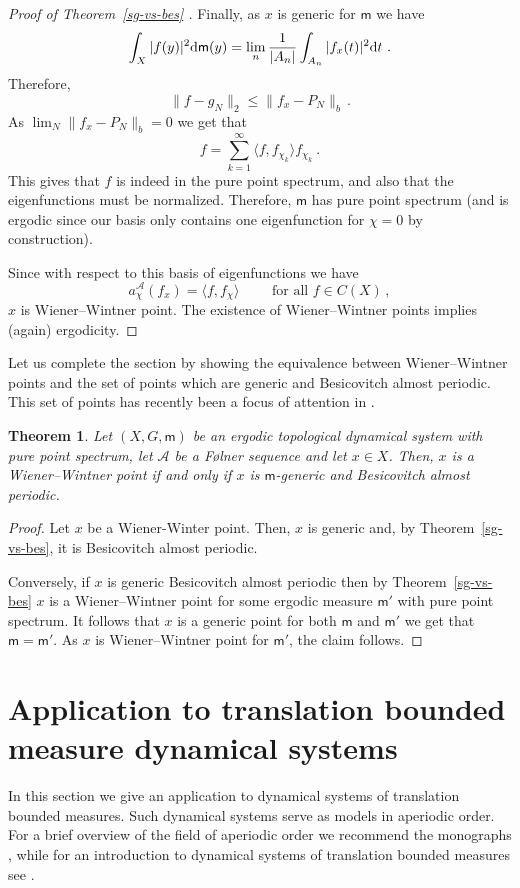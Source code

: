 \documentclass [14pt]{amsart}
\numberwithin{equation}{section}
\newcommand{\cA}{{\mathcal A}}
\newcommand{\mm}{\mathsf{m}}
\newcommand{\dd}{\mbox{\rm d}}
\newtheorem{theorem}{Theorem}[section]
\begin{document}
\begin{proof}[Proof of Theorem~\ref{sg-vs-bes} ]
Finally, as $x$ is generic for $\mm$ we have
\[
\int_{X} |f(y)|^2 \dd \mm(y) = \lim_n \frac{1}{|A_n|} \int_{A_n} |f_x(t)|^2 \dd t \ .
\]
Therefore,
\[
 \| f-g_N \|_{2} \leq \| f_x-P_N \|_{b} \,.
\]
As $\lim_N \| f_x-P_N \|_{b} =0$ we get that
\[
f= \sum_{k=1}^\infty \langle f, f_{\chi_k} \rangle f_{\chi_k} \ .
\]
This gives that $f$ is indeed in the pure point spectrum, and also that the eigenfunctions must be normalized. Therefore, $\mm$ has pure point spectrum (and is ergodic since our basis only contains one eigenfunction for $\chi=0$ by construction).

Since with respect to this basis of eigenfunctions we have
\[
a_\chi^\cA(f_x)=\langle f, f_\chi \rangle \qquad \mbox{ for all } f \in C(X) \,,
\]
$x$ is Wiener--Wintner point. The existence of Wiener--Wintner points implies (again) ergodicity.
\end{proof}

Let us complete the section by showing the equivalence between Wiener--Wintner points and the set of points which are generic and Besicovitch almost periodic.
This set of points has recently been a focus of attention  in \cite[Theorem~2]{KK}.

\begin{theorem} Let $(X, G, \mm)$ be an ergodic topological  dynamical system with pure point spectrum, let $\cA$ be a F\o lner sequence and let $x \in X$. Then, $x$ is a Wiener--Wintner point if and only if $x$ is $\mm$-generic and  Besicovitch almost periodic.
\end{theorem}
\begin{proof}
Let $x$ be a Wiener-Winter point. Then, $x$ is generic and, by  Theorem~\ref{sg-vs-bes}, it is Besicovitch almost periodic.

Conversely, if $x$ is generic Besicovitch almost periodic then  by Theorem~\ref{sg-vs-bes} $x$ is a Wiener--Wintner point  for some ergodic measure $\mm'$ with pure point spectrum.
It follows that $x$ is a generic point for both $\mm$ and $\mm'$ we get that $\mm=\mm'$. As $x$ is Wiener--Wintner point for $\mm'$, the claim follows.
\end{proof}


\section{Application to translation bounded measure dynamical systems}\label{sec-Application}
In this  section we give an  application to dynamical systems of translation bounded measures. Such dynamical systems serve as  models in aperiodic order. For a brief overview of the field of aperiodic order we recommend the monographs \cite{TAO,KLS}, while for an introduction to dynamical systems of translation bounded measures see \cite{BL}.
\end{document}
